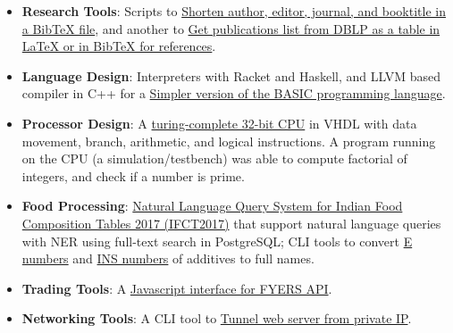 \begin{itemize}[noitemsep, leftmargin=*]
  \item \textbf{Research Tools}:
    Scripts to \href{https://github.com/javascriptf/script-minify-bibtex}{Shorten author, editor, journal, and booktitle in a BibTeX file},
    and another to \href{https://github.com/javascriptf/script-publications-list}{Get publications list from DBLP as a table in LaTeX or in BibTeX for references}.
  \item \textbf{Language Design}:
    Interpreters with Racket and Haskell, and
    LLVM based compiler in C++ for a \href{https://github.com/compilerz/basic}{Simpler version of the BASIC programming language}.
  \item \textbf{Processor Design}:
    A \href{https://github.com/vhdlf/cpu_basic}{turing-complete 32-bit CPU} in VHDL with data movement, branch, arithmetic, and logical instructions. A program running on the CPU (a simulation/testbench) was able to compute factorial of integers, and check if a number is prime.
  \item \textbf{Food Processing}:
    \href{https://ifct2017.github.io}{Natural Language Query System for Indian Food Composition Tables 2017 (IFCT2017)} that support natural language queries with NER using full-text search in PostgreSQL;
    CLI tools to convert \href{https://github.com/nodef/food-e}{E numbers} and \href{https://github.com/nodef/food-ins}{INS numbers} of additives to full names.
  \item \textbf{Trading Tools}:
    A \href{https://github.com/nodef/extra-fyers}{Javascript interface for FYERS API}.
  \item \textbf{Networking Tools}:
    A CLI tool to \href{https://github.com/nodef/extra-tunnel}{Tunnel web server from private IP}.

\end{itemize}
